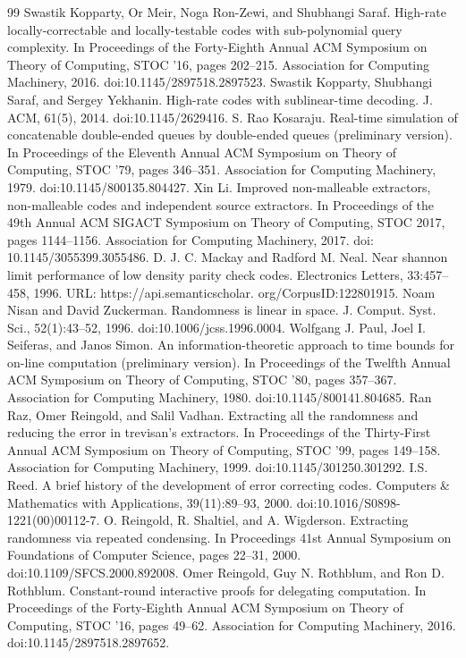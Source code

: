 \begin{thebibliography}{99}
 Swastik Kopparty, Or Meir, Noga Ron-Zewi, and Shubhangi Saraf. High-rate locally-correctable and locally-testable codes with sub-polynomial query complexity. In Proceedings of the Forty-Eighth Annual ACM Symposium on Theory of Computing, STOC ’16, pages 202–215. Association for Computing Machinery, 2016. doi:10.1145/2897518.2897523.
 Swastik Kopparty, Shubhangi Saraf, and Sergey Yekhanin. High-rate codes with sublinear-time decoding. J. ACM, 61(5), 2014. doi:10.1145/2629416.
 S. Rao Kosaraju. Real-time simulation of concatenable double-ended queues by double-ended queues (preliminary version). In Proceedings of the Eleventh Annual ACM Symposium on Theory of Computing, STOC ’79, pages 346–351. Association for Computing Machinery, 1979. doi:10.1145/800135.804427.
 Xin Li. Improved non-malleable extractors, non-malleable codes and independent source extractors. In Proceedings of the 49th Annual ACM SIGACT Symposium on Theory of Computing, STOC 2017, pages 1144–1156. Association for Computing Machinery, 2017. doi: 10.1145/3055399.3055486.
 D. J. C. Mackay and Radford M. Neal. Near shannon limit performance of low density parity check codes. Electronics Letters, 33:457–458, 1996. URL: https://api.semanticscholar. org/CorpusID:122801915.
 Noam Nisan and David Zuckerman. Randomness is linear in space. J. Comput. Syst. Sci., 52(1):43–52, 1996. doi:10.1006/jcss.1996.0004.
 Wolfgang J. Paul, Joel I. Seiferas, and Janos Simon. An information-theoretic approach to time bounds for on-line computation (preliminary version). In Proceedings of the Twelfth Annual ACM Symposium on Theory of Computing, STOC ’80, pages 357–367. Association for Computing Machinery, 1980. doi:10.1145/800141.804685.
 Ran Raz, Omer Reingold, and Salil Vadhan. Extracting all the randomness and reducing the error in trevisan’s extractors. In Proceedings of the Thirty-First Annual ACM Symposium on Theory of Computing, STOC ’99, pages 149–158. Association for Computing Machinery, 1999. doi:10.1145/301250.301292.
 I.S. Reed. A brief history of the development of error correcting codes. Computers \& Mathematics with Applications, 39(11):89–93, 2000. doi:10.1016/S0898-1221(00)00112-7.
 O. Reingold, R. Shaltiel, and A. Wigderson. Extracting randomness via repeated condensing. In Proceedings 41st Annual Symposium on Foundations of Computer Science, pages 22–31, 2000. doi:10.1109/SFCS.2000.892008.
 Omer Reingold, Guy N. Rothblum, and Ron D. Rothblum. Constant-round interactive proofs for delegating computation. In Proceedings of the Forty-Eighth Annual ACM Symposium on Theory of Computing, STOC ’16, pages 49–62. Association for Computing Machinery, 2016. doi:10.1145/2897518.2897652.

\end{thebibliography}
